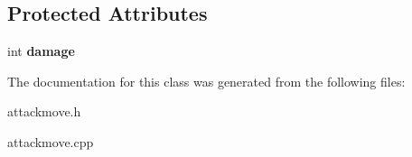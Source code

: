 \subsection*{Protected Attributes}
\begin{DoxyCompactItemize}
\item 
\hypertarget{classattackmove_abeaa53553d9b169032ac273ef2ea7b67}{int {\bfseries damage}}\label{classattackmove_abeaa53553d9b169032ac273ef2ea7b67}

\end{DoxyCompactItemize}


The documentation for this class was generated from the following files\-:\begin{DoxyCompactItemize}
\item 
attackmove.\-h\item 
attackmove.\-cpp\end{DoxyCompactItemize}

